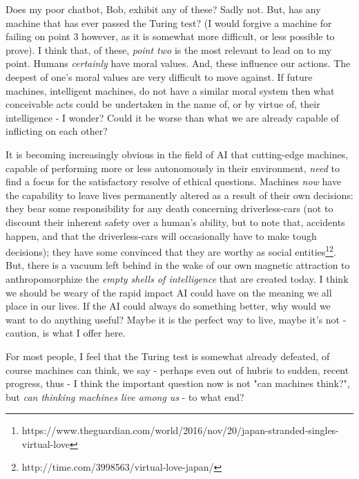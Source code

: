 \documentclass[]{article}
\begin{document}
\noindent
Does my poor chatbot, Bob, exhibit any of these? Sadly not. But, has any machine that has ever passed the Turing test? (I would forgive a machine for failing on point 3 however, as it is somewhat more difficult, or less possible to prove).
I think that, of these, \emph{point two} is the most relevant to lead on to my point. Humans \emph{certainly} have moral values. And, these influence our actions. The deepest of one's moral values are very difficult to move against. If future machines, intelligent machines, do not have a similar moral system then what conceivable acts could be undertaken in the name of, or by virtue of, their intelligence - I wonder? Could it be worse than what we are already capable of inflicting on each other?

It is becoming increasingly obvious in the field of AI that cutting-edge machines, capable of performing more or less autonomously in their environment, \emph{need} to find a focus for the satisfactory resolve of ethical questions. Machines \emph{now} have the capability to leave lives permanently altered as a result of their own decisions: they bear some responsibility for any death concerning driverless-cars (not to discount their inherent safety over a human's ability, but to note that, accidents happen, and that the driverless-cars will occasionally have to make tough decisions); they have some convinced that they are worthy as social entities\footnote{https://www.theguardian.com/world/2016/nov/20/japan-stranded-singles-virtual-love}\footnote{http://time.com/3998563/virtual-love-japan/}. But, there is a vacuum left behind in the wake of our own magnetic attraction to anthropomorphize the \emph{empty shells of intelligence} that are created today. I think we should be weary of the rapid impact AI could have on the meaning we all place in our lives. If the AI could always do something better, why would we want to do anything useful? Maybe it is the perfect way to live, maybe it's not - caution, is what I offer here.

For most people, I feel that the Turing test is somewhat already defeated, of course machines can think, we say - perhaps even out of hubris to sudden, recent progress, thus - I think the important question now is not "can machines think?", but \emph{can thinking machines live among us} - to what end?



\end{document}
